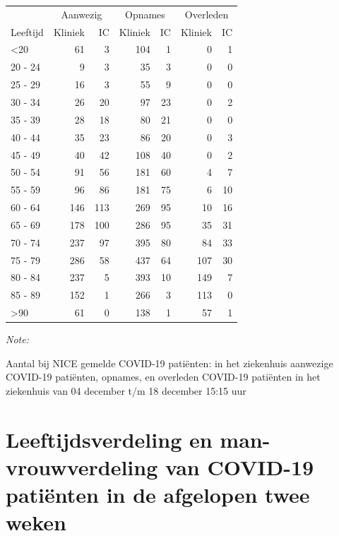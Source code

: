 \documentclass[
  english,
  man,floatsintext]{apa6}
\begin{document}
\begin{table}
\centering\begingroup\fontsize{10}{12}\selectfont

\begin{threeparttable}
\begin{tabular}{lrrrrrr}
\toprule
\multicolumn{1}{c}{ } & \multicolumn{2}{c}{Aanwezig} & \multicolumn{2}{c}{Opnames} & \multicolumn{2}{c}{Overleden} \\
\cmidrule(l{3pt}r{3pt}){2-3} \cmidrule(l{3pt}r{3pt}){4-5} \cmidrule(l{3pt}r{3pt}){6-7}
Leeftijd & Kliniek & IC & Kliniek & IC & Kliniek & IC\\
\midrule
<20 & 61 & 3 & 104 & 1 & 0 & 1\\
20 - 24 & 9 & 3 & 35 & 3 & 0 & 0\\
25 - 29 & 16 & 3 & 55 & 9 & 0 & 0\\
30 - 34 & 26 & 20 & 97 & 23 & 0 & 2\\
35 - 39 & 28 & 18 & 80 & 21 & 0 & 0\\
40 - 44 & 35 & 23 & 86 & 20 & 0 & 3\\
45 - 49 & 40 & 42 & 108 & 40 & 0 & 2\\
50 - 54 & 91 & 56 & 181 & 60 & 4 & 7\\
55 - 59 & 96 & 86 & 181 & 75 & 6 & 10\\
60 - 64 & 146 & 113 & 269 & 95 & 10 & 16\\
65 - 69 & 178 & 100 & 286 & 95 & 35 & 31\\
70 - 74 & 237 & 97 & 395 & 80 & 84 & 33\\
75 - 79 & 286 & 58 & 437 & 64 & 107 & 30\\
80 - 84 & 237 & 5 & 393 & 10 & 149 & 7\\
85 - 89 & 152 & 1 & 266 & 3 & 113 & 0\\
>90 & 61 & 0 & 138 & 1 & 57 & 1\\
\bottomrule
\end{tabular}
\begin{tablenotes}
\item \textit{Note: } 
\item Aantal bij NICE gemelde COVID-19 patiënten: in het ziekenhuis aanwezige COVID-19 patiënten, opnames, en overleden COVID-19 patiënten in het ziekenhuis van 04 december t/m 18 december 15:15 uur
\end{tablenotes}
\end{threeparttable}
\endgroup{}
\end{table}

\newpage

\hypertarget{leeftijdsverdeling-en-man-vrouwverdeling-van-covid-19-patiuxebnten-in-de-afgelopen-twee-weken}{%
\section{Leeftijdsverdeling en man-vrouwverdeling van COVID-19 patiënten in de afgelopen twee weken}\label{leeftijdsverdeling-en-man-vrouwverdeling-van-covid-19-patiuxebnten-in-de-afgelopen-twee-weken}}
\end{document}
